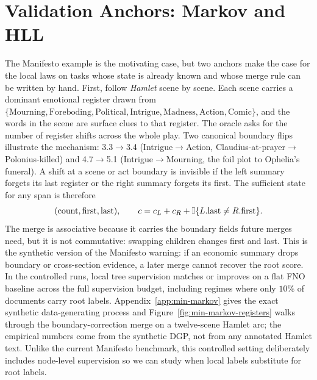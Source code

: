\section{Validation Anchors: Markov and HLL}\label{sec:min-validation}

The Manifesto example is the motivating case, but two anchors make the case
for the local laws on tasks whose state is already known and whose merge
rule can be written by hand. First, follow \emph{Hamlet} scene by scene.
Each scene carries a dominant emotional register drawn from
\(\{\text{Mourning}, \text{Foreboding}, \text{Political}, \text{Intrigue},
\text{Madness}, \text{Action}, \text{Comic}\}\), and the words in the scene
are surface clues to that register. The oracle asks for the number of register
shifts across the whole play. Two canonical boundary flips illustrate the
mechanism: 3.3\(\to\)3.4 (Intrigue\(\to\)Action, Claudius-at-prayer\(\to\)
Polonius-killed) and 4.7\(\to\)5.1 (Intrigue\(\to\)Mourning, the foil plot
to Ophelia's funeral). A shift at a scene or act boundary is invisible if
the left summary forgets its last register or the right summary forgets its
first. The sufficient state for any span is therefore
\[
(\mathrm{count},\mathrm{first},\mathrm{last}),
\qquad
c=c_L+c_R+\mathbb{I}\{L.\mathrm{last}\ne R.\mathrm{first}\}.
\]
The merge is associative because it carries the boundary fields future merges
need, but it is not commutative: swapping children changes first and last.
This is the synthetic version of the Manifesto warning: if an economic summary
drops boundary or cross-section evidence, a later merge cannot recover the root
score. In the controlled runs, local tree supervision matches or improves on
a flat FNO baseline across the full supervision budget, including
regimes where only $10\%$ of documents carry root labels. Appendix~\ref{app:min-markov} gives
the exact synthetic data-generating process and
Figure~\ref{fig:min-markov-registers} walks through the boundary-correction
merge on a twelve-scene Hamlet arc; the empirical numbers come from the
synthetic DGP, not from any annotated Hamlet text. Unlike the current
Manifesto benchmark, this controlled setting deliberately includes node-level
supervision so we can study when local labels substitute for root labels.

